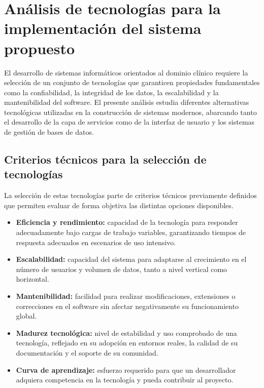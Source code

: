 \section{Análisis de tecnologías para la implementación del sistema propuesto}
\label{section:analisis_tecnologias}

El desarrollo de sistemas informáticos orientados al dominio clínico requiere la selección de un conjunto de tecnologías que garanticen propiedades fundamentales como la confiabilidad, la integridad de los datos, la escalabilidad y la mantenibilidad del software. El presente análisis estudia diferentes alternativas tecnológicas utilizadas en la construcción de sistemas modernos, abarcando tanto el desarrollo de la capa de servicios como de la interfaz de usuario y los sistemas de gestión de bases de datos.

\subsection{Criterios técnicos para la selección de tecnologías}
\label{subsection:criterios}

La selección de estas tecnologías parte de criterios técnicos previamente definidos que permiten evaluar de forma objetiva las distintas opciones disponibles.

\begin{itemize}
    \item \textbf{Eficiencia y rendimiento:} capacidad de la tecnología para responder adecuadamente bajo cargas de trabajo variables, garantizando tiempos de respuesta adecuados en escenarios de uso intensivo.
    \item \textbf{Escalabilidad:} capacidad del sistema para adaptarse al crecimiento en el número de usuarios y volumen de datos, tanto a nivel vertical como horizontal.
    \item \textbf{Mantenibilidad:} facilidad para realizar modificaciones, extensiones o correcciones en el software sin afectar negativamente su funcionamiento global.
    \item \textbf{Madurez tecnológica:} nivel de estabilidad y uso comprobado de una tecnología, reflejado en su adopción en entornos reales, la calidad de su documentación y el soporte de su comunidad.
    \item \textbf{Curva de aprendizaje:} esfuerzo requerido para que un desarrollador adquiera competencia en la tecnología y pueda contribuir al proyecto.
\end{itemize}

